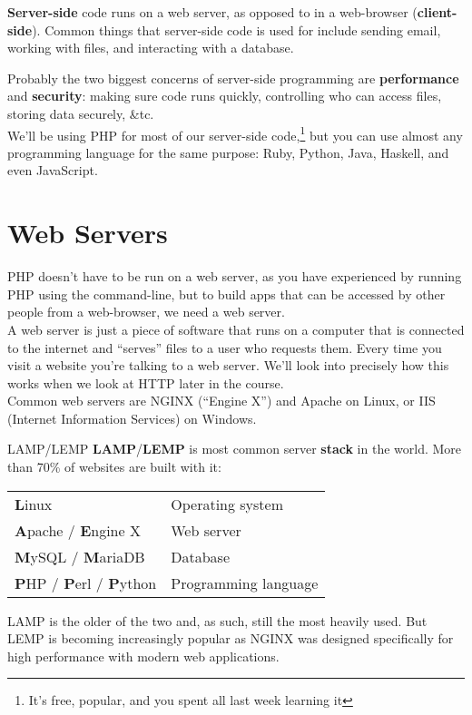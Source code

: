 \textbf{Server-side} code runs on a web server, as opposed to in a web-browser (\textbf{client-side}). Common things that server-side code is used for include sending email, working with files, and interacting with a database.


Probably the two biggest concerns of server-side programming are \textbf{performance} and \textbf{security}: making sure code runs quickly, controlling who can access files, storing data securely, \&tc.
\\

We'll be using PHP for most of our server-side code,\footnote{It's free, popular, and you spent all last week learning it} but you can use almost any programming language for the same purpose: Ruby, Python, Java, Haskell, and even JavaScript.


\section{Web Servers}

PHP doesn't have to be run on a web server, as you have experienced by running PHP using the command-line, but to build apps that can be accessed by other people from a web-browser, we need a web server.
\\

A web server is just a piece of software that runs on a computer that is connected to the internet and ``serves'' files to a user who requests them. Every time you visit a website you're talking to a web server. We'll look into precisely how this works when we look at HTTP later in the course.
\\

Common web servers are NGINX (``Engine X'') and Apache on Linux, or IIS (Internet Information Services) on Windows.

\begin{infobox}{LAMP/LEMP}
    \textbf{LAMP}/\textbf{LEMP} is most common server \textbf{stack} in the world. More than 70\% of websites are built with it:
    \\

    \begin{tabularx}{\textwidth}{l X}
        \textbf{L}inux  &   Operating system \\
        \textbf{A}pache / \textbf{E}ngine X   &   Web server \\
        \textbf{M}ySQL / \textbf{M}ariaDB &   Database \\
        \textbf{P}HP / \textbf{P}erl / \textbf{P}ython    &   Programming language \\
    \end{tabularx}

    \par\bigskip

    LAMP is the older of the two and, as such, still the most heavily used. But LEMP is becoming increasingly popular as NGINX was designed specifically for high performance with modern web applications.
\end{infobox}

